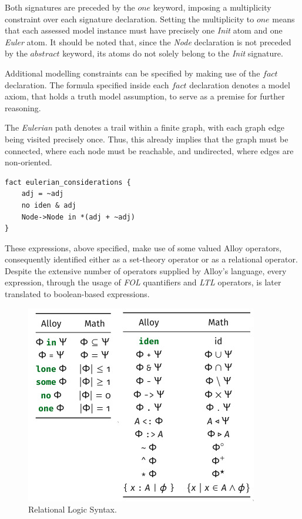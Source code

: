 Both signatures are preceded by the $one$ keyword, imposing a multiplicity constraint over each signature declaration. Setting the multiplicity to $one$ means that each assessed model instance must have precisely one \textit{Init} atom and one \textit{Euler} atom. It should be noted that, since the \textit{Node} declaration is not preceded by the $abstract$ keyword, its atoms do not solely belong to the \textit{Init} signature. 

Additional modelling constraints can be specified by making use of the $fact$ declaration. The formula specified inside each $fact$ declaration denotes a model axiom, that holds a truth model assumption, to serve as a premise for further reasoning. 

The \textit{Eulerian} path denotes a trail within a finite graph, with each graph edge being visited precisely once. Thus, this already implies that the graph must be connected, where each node must be reachable, and undirected, where edges are non-oriented.

\begin{lstlisting}[title={Graph restrictions through $fact$ declaration.}, otherkeywords = {abstract, sig, module, set, fact, iden, no, in, \=, \*, \+, \~, \-\>, \&}, floatplacement=H]
fact eulerian_considerations {
    adj = ~adj
    no iden & adj
    Node->Node in *(adj + ~adj)
}
\end{lstlisting}

These expressions, above specified, make use of some valued Alloy operators, consequently identified either as a set-theory operator or as a relational operator. Despite the extensive number of operators supplied by Alloy's language, every expression, through the usage of \textit{FOL} quantifiers and \textit{LTL} operators, is later translated to boolean-based expressions. 

\begin{figure}[H]
    \centering
    \includegraphics[width=0.5\linewidth]{img/alloy_relational_logic.jpg}
    \caption{Relational Logic Syntax.}
    \label{fig:alloy-rel}
\end{figure}

